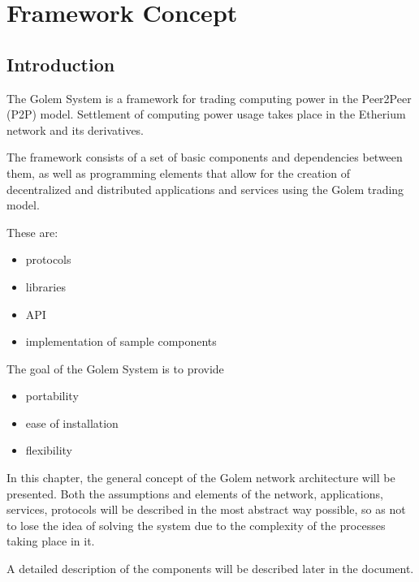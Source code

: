 \section{Framework Concept}

\subsection{Introduction}

The Golem System is a framework for trading computing power in the Peer2Peer (P2P) model.
Settlement of computing power usage takes place in the Etherium network and its derivatives.

The framework consists of a set of basic components and dependencies between them, 
as well as programming elements that allow for the creation of decentralized and distributed
applications and services using the Golem trading model.

These are:

\begin{itemize}

\item protocols
\item libraries
\item API
\item implementation of sample components

\end{itemize}

The goal of the Golem System is to provide

\begin{itemize}

\item portability
\item ease of installation
\item flexibility

\end{itemize}

In this chapter, the general concept of the Golem network architecture will be presented. 
Both the assumptions and elements of the network, applications, services, protocols will be 
described in the most abstract way possible, so as not to lose the idea of ​​solving the system 
due to the complexity of the processes taking place in it.

A detailed description of the components will be described later in the document.


